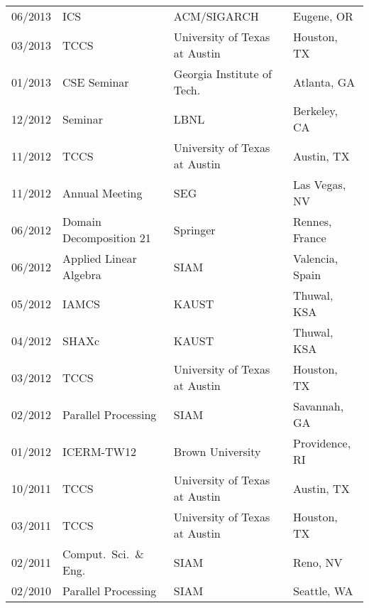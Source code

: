 \documentclass[letterpaper]{article}
\begin{document}
\begin{tabular}{rlll}
06/2013 & ICS                             & ACM/SIGARCH                   & Eugene, OR \\
03/2013 & TCCS                            & University of Texas at Austin & Houston, TX \\
01/2013 & CSE Seminar                     & Georgia Institute of Tech.\   &  Atlanta, GA \\
12/2012 & Seminar                         & LBNL                          &  Berkeley, CA \\
11/2012 & TCCS                            & University of Texas at Austin & Austin, TX \\
11/2012 & Annual Meeting                  & SEG                           & Las Vegas, NV \\
06/2012 & Domain Decomposition 21         & Springer                      & Rennes, France \\
06/2012 & Applied Linear Algebra          & SIAM                          & Valencia, Spain \\
05/2012 & IAMCS                           & KAUST                         & Thuwal, KSA \\
04/2012 & SHAXc                           & KAUST                         & Thuwal, KSA \\
03/2012 & TCCS                            & University of Texas at Austin & Houston, TX \\
02/2012 & Parallel Processing             & SIAM                          & Savannah, GA \\
01/2012 & ICERM-TW12                      & Brown University              & Providence, RI \\
10/2011 & TCCS                            & University of Texas at Austin & Austin, TX \\
03/2011 & TCCS                            & University of Texas at Austin & Houston, TX \\
02/2011 & Comput.\ Sci.\ \& Eng.\         & SIAM                          & Reno, NV \\
02/2010 & Parallel Processing             & SIAM                          & Seattle, WA \\
\end{tabular}
\end{document}
